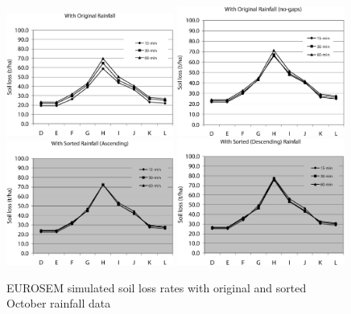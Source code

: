 \begin{figure}[htbp]
  \centering
    \includegraphics[width=0.49\textwidth]{./img/eurosem_soilloss_with_original}
    \includegraphics[width=0.49\textwidth]
{./img/eurosem_soilloss_with_original_nogap}\\[5mm]
    \includegraphics[width=0.49\textwidth]
{./img/eurosem_soilloss_with_sorted_asc}
    \includegraphics[width=0.49\textwidth]
{./img/eurosem_soilloss_with_sorted_des}
  \caption{EUROSEM simulated soil loss rates with original and sorted October
rainfall data}
  \label{fig:eurosem_soilloss_results}
\end{figure}

